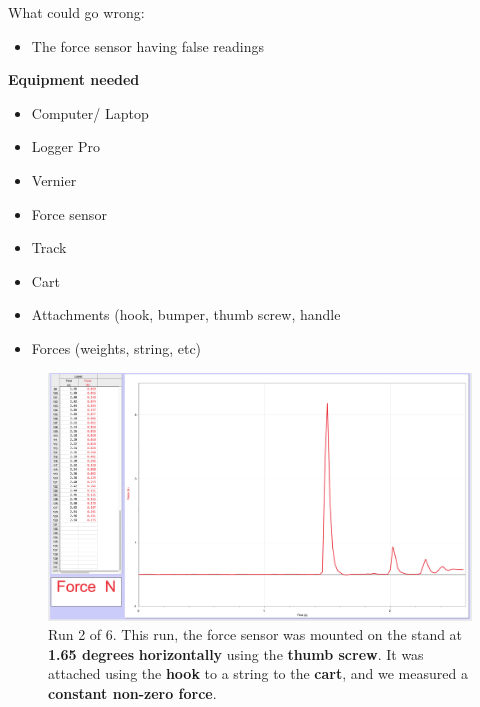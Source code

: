 \documentclass[idxtotoc,hyperref,openany]{labbook} %
\begin{document}
\hfill \break
What could go wrong:
\begin{itemize}
    \item The force sensor having false readings
\end{itemize}

\hfill \break
\textbf{Equipment needed}
\begin{itemize}
    \item Computer/ Laptop
    \item Logger Pro
    \item Vernier
    \item Force sensor
    \item Track
    \item Cart
    \item Attachments (hook, bumper, thumb screw, handle
    \item Forces (weights, string, etc)
\end{itemize}


\newpage
\hfill \break
{}
\begin{figure}[H] %
\begin{center}
\includegraphics[width=1\linewidth]{images/Lab.05/Lab05.Run2.png}
\end{center}
\caption{Run 2 of 6. This run, the force sensor was mounted on the stand at \textbf{1.65 degrees} \textbf{horizontally} using the \textbf{thumb screw}. It was attached using the \textbf{hook} to a string to the \textbf{cart}, and we measured a \textbf{constant non-zero force}.}
\label{fig:Lab05-Run2}
\end{figure}
\end{document}
